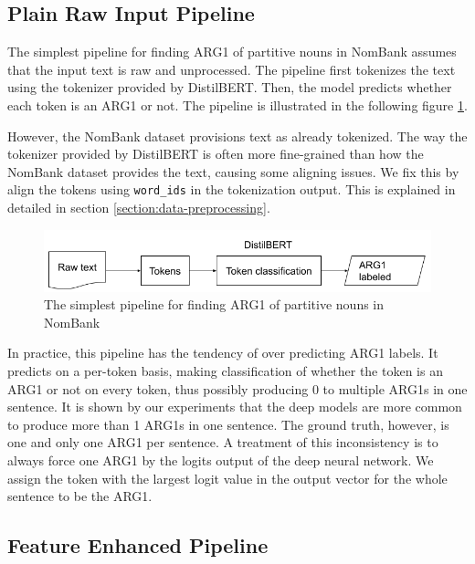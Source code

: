\documentclass[11pt]{article}
\begin{document}
\subsection{Plain Raw Input Pipeline}
\label{section:plain-pipeline}

The simplest pipeline for finding ARG1 of partitive nouns in NomBank assumes that the input text is raw and unprocessed. The pipeline first tokenizes the text using the tokenizer provided by DistilBERT. Then, the model predicts whether each token is an ARG1 or not. The pipeline is illustrated in the following figure \ref{fig:simplest-arg1-pipeline}.

However, the NomBank dataset provisions text as already tokenized. The way the tokenizer provided by DistilBERT is often more fine-grained than how the NomBank dataset provides the text, causing some aligning issues. We fix this by align the tokens using \verb|word_ids| in the tokenization output. This is explained in detailed in section \ref{section:data-preprocessing}.

\begin{figure}[h]
  \centering
  \includegraphics[width=\linewidth]{assets/simplest-arg1-pipeline.png}
  \caption{The simplest pipeline for finding ARG1 of partitive nouns in NomBank}
  \label{fig:simplest-arg1-pipeline}
\end{figure}

In practice, this pipeline has the tendency of over predicting ARG1 labels. It predicts on a per-token basis, making classification of whether the token is an ARG1 or not on every token, thus possibly producing 0 to multiple ARG1s in one sentence. It is shown by our experiments that the deep models are more common to produce more than 1 ARG1s in one sentence. The ground truth, however, is one and only one ARG1 per sentence. A treatment of this inconsistency is to always force one ARG1 by the logits output of the deep neural network. We assign the token with the largest logit value in the output vector for the whole sentence to be the ARG1.

\subsection{Feature Enhanced Pipeline}
\end{document}

